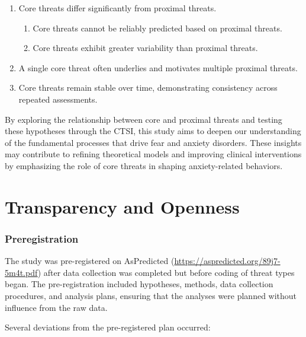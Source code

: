 \documentclass[
  man,floatsintext]{apa7}
\providecommand{\tightlist}{%
  \setlength{\itemsep}{0pt}\setlength{\parskip}{0pt}}
\begin{document}
\begin{enumerate}
\def\labelenumi{\arabic{enumi}.}
\tightlist
\item
  Core threats differ significantly from proximal threats.

  \begin{enumerate}
  \def\labelenumii{\alph{enumii}.}
  \tightlist
  \item
    Core threats cannot be reliably predicted based on proximal threats.
  \item
    Core threats exhibit greater variability than proximal threats.
  \end{enumerate}
\item
  A single core threat often underlies and motivates multiple proximal threats.
\item
  Core threats remain stable over time, demonstrating consistency across repeated assessments.
\end{enumerate}

By exploring the relationship between core and proximal threats and testing these hypotheses through the CTSI, this study aims to deepen our understanding of the fundamental processes that drive fear and anxiety disorders.
These insights may contribute to refining theoretical models and improving clinical interventions by emphasizing the role of core threats in shaping anxiety-related behaviors.

\section{Transparency and Openness}\label{transparency-and-openness}

\subsubsection{Preregistration}\label{preregistration}

The study was pre-registered on AsPredicted (\url{https://aspredicted.org/89j7-5m4t.pdf}) after data collection was completed but before coding of threat types began.
The pre-registration included hypotheses, methods, data collection procedures, and analysis plans, ensuring that the analyses were planned without influence from the raw data.

Several deviations from the pre-registered plan occurred:
\end{document}
